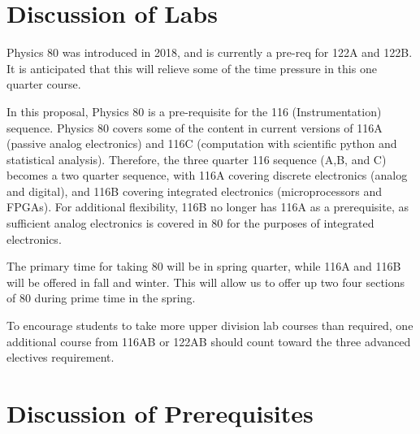\documentclass[12pt]{article}
\begin{document}
\section{Discussion of Labs}

Physics 80 was introduced in 2018, and is currently a pre-req for 122A and 122B.  It is anticipated that this will relieve some of the time pressure in this one quarter course.

In this proposal, Physics 80 is a pre-requisite for the 116 (Instrumentation) sequence.  Physics 80 covers some of the content in current versions of 116A (passive analog electronics) and 116C (computation with scientific python and statistical analysis).  Therefore, the three quarter 116 sequence (A,B, and C) becomes a two quarter sequence, with 116A covering discrete electronics (analog and digital), and 116B covering integrated electronics (microprocessors and FPGAs).  For additional flexibility, 116B no longer has 116A as a prerequisite, as sufficient analog electronics is covered in 80 for the purposes of integrated electronics.

The primary time for taking 80 will be in spring quarter, while 116A and 116B will be offered in fall and winter.  This will allow us to offer up two four sections of 80 during prime time in the spring.

To encourage students to take more upper division lab courses than required, one additional course from 116AB or 122AB should count toward the three advanced electives requirement.

\section{Discussion of Prerequisites}
\end{document}

